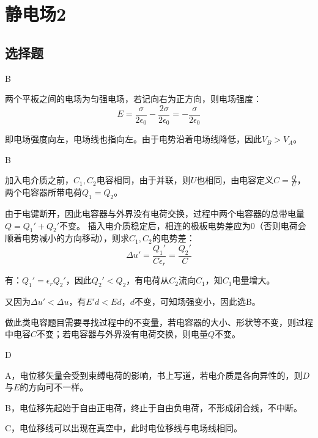 \documentclass[b5paper,opensource,sourcefont,parskip]{qyxf-book}
\begin{document}
\chapter{静电场2}  %
\section{选择题}  %

B  %

\solve  %
两个平板之间的电场为匀强电场，若记向右为正方向，则电场强度：
\[E=\frac{\sigma}{2\epsilon_0}-\frac{2\sigma}{2\epsilon_0}=-\frac{\sigma}{2\epsilon_0}\]

即电场强度向左，电场线也指向左。由于电势沿着电场线降低，因此$V_B>V_A$。

B

\solve 加入电介质之前，$ C_1,C_2 $电容相同，由于并联，则$ U $也相同，由电容定义$ C=\frac{Q}{U} $，两个电容器所带电荷$ Q_1=Q_2 $。

由于电键断开，因此电容器与外界没有电荷交换，过程中两个电容器的总带电量$ Q=Q_1'+Q_2' $不变。
插入电介质稳定后，相连的极板电势差应为$ 0 $（否则电荷会顺着电势减小的方向移动），则求$ C_1,C_2 $的电势差：
\[\Delta u'=\frac{Q_1'}{C\epsilon_r}=\frac{Q_2'}{C}\]

有：$Q_1'=\epsilon_r Q_2'$，因此$Q_2'<Q_2$，有电荷从$C_2$流向$C_1$，知$C_1$电量增大。

又因为$\Delta u'<\Delta u$，有$E'd<Ed$，$d$不变，可知场强变小，因此选B。

\note 做此类电容题目需要寻找过程中的不变量，若电容器的大小、形状等不变，则过程中电容$ C $不变；若电容器与外界没有电荷交换，则电量$ Q $不变。

D

\solve A，电位移矢量会受到束缚电荷的影响，书上写道，若电介质是各向异性的，则$ D $与$ E $的方向可不一样。

B，电位移先起始于自由正电荷，终止于自由负电荷，不形成闭合线，不中断。

C，电位移线可以出现在真空中，此时电位移线与电场线相同。
\end{document}
